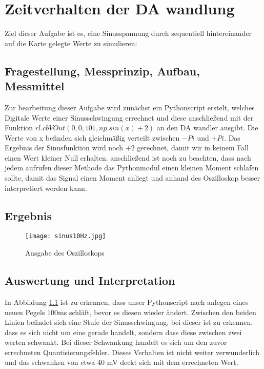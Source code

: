 %
%
\chapter{Zeitverhalten der DA wandlung}
Ziel dieser Aufgabe ist es, eine Sinusspannung durch sequentiell hintereinander auf die Karte gelegte Werte zu simulieren:
\label{chap:ZeitverhaltenDA}
\section{Fragestellung, Messprinzip, Aufbau, Messmittel}
\label{chap:VERSUCH_4_FRAGESTELLUNG}
Zur bearbeitung dieser Aufgabe wird zunächst ein Pythonscript erstelt, welches Digitale Werte einer Sinusschwingung errechnet und diese anschließend mit der Funktion $rl.cbVOut(0,0,101,np.sin(x)+2)$ an den DA wandler ausgibt. Die Werte von x befinden sich gleichmäßig verteilt zwischen $-Pi$ und $+Pi$. Das Ergebnis der Sinusfunktion wird noch +2 gerechnet, damit wir in keinem Fall einen Wert kleiner Null erhalten. anschließend ist noch zu beachten, dass nach jedem aufrufen dieser Methode das Pythonmodul einen kleinen Moment schlafen sollte, damit das Signal einen Moment anliegt und anhand des Oszilloskop besser interpretiert werden kann.
\section{Ergebnis}
\label{chap:VERSUCH_4_MESSWERTE}

\begin{figure}[H]
\centering
\texttt{[image: sinus10Hz.jpg]}
\caption{Ausgabe des Oszilloskops}
\label{fig:Oszi}
\end{figure}


\section{Auswertung und Interpretation}
\label{chap:V4_AUSWERTUNGUNDINTERPRETATION}
In Abbildung \ref{fig:Oszi} ist zu erkennen, dass unser Pythonscript nach anlegen eines neuen Pegels 100ms schläft, bevor es diesen wieder ändert.
Zwischen den beiden Linien befindet sich eine Stufe der Sinusschwingung, bei dieser ist zu erkennen, dass es sich nicht um eine  gerade handelt, sondern dass diese zwischen zwei werten schwankt. Bei dieser Schwankung handelt es sich um den zuvor errechneten Quantisierungsfehler. Dieses Verhalten ist nicht weiter verwunderlich und das schwanken von etwa 40 mV deckt sich mit dem errechneten Wert.
